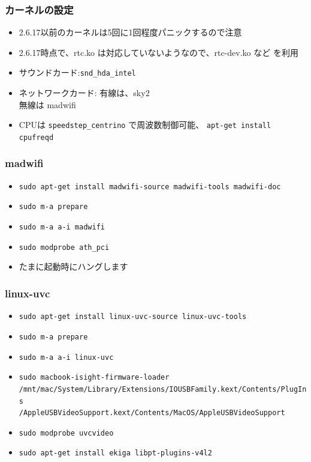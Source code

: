 \documentclass[cjk,dvipdfmx]{beamer}
\begin{document}
\begin{frame}
 \frametitle{カーネルの設定}
\begin{itemize}
 \item 2.6.17以前のカーネルは5回に1回程度パニックするので注意
 \item 2.6.17時点で、rtc.ko は対応していないようなので、rtc-dev.ko など
       を利用
 \item サウンドカード:\texttt{snd\_hda\_intel}
 \item ネットワークカード: 有線は、sky2\\
       無線は madwifi
 \item CPUは \texttt{speedstep\_centrino} で周波数制御可能、
       \texttt{apt-get install cpufreqd}
\end{itemize}
\end{frame}

\begin{frame}
 \frametitle{madwifi}
 \begin{itemize}
  \item \texttt{sudo apt-get install madwifi-source madwifi-tools madwifi-doc}
  \item \texttt{sudo m-a prepare}
  \item \texttt{sudo m-a a-i madwifi}
  \item \texttt{sudo modprobe ath\_pci}
  \item<2-> たまに起動時にハングします
 \end{itemize}
\end{frame}

\begin{frame}
 \frametitle{linux-uvc}
 \begin{itemize}
  \item \texttt{sudo apt-get install linux-uvc-source linux-uvc-tools}
  \item \texttt{sudo m-a prepare}
  \item \texttt{sudo m-a a-i linux-uvc}
  \item \texttt{sudo macbook-isight-firmware-loader \\
       /mnt/mac/System/Library/Extensions/IOUSBFamily.kext/Contents/PlugIns\\/AppleUSBVideoSupport.kext/Contents/MacOS/AppleUSBVideoSupport}
  \item \texttt{sudo modprobe uvcvideo}
  \item \texttt{sudo apt-get install ekiga libpt-plugins-v4l2}
 \end{itemize}
\end{frame}
\end{document}
